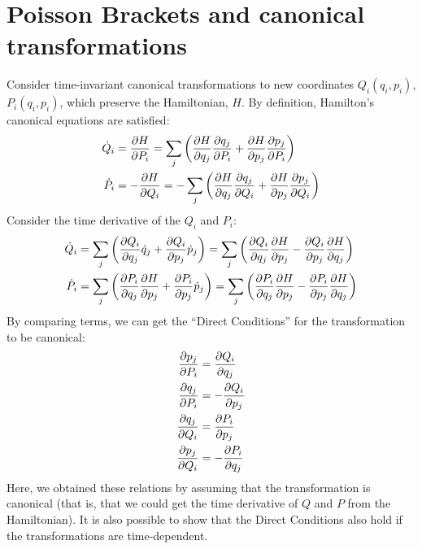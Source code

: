 \section{Poisson Brackets and canonical transformations}
Consider time-invariant canonical transformations to new coordinates $Q_i(q_i,p_i)$, $P_i(q_i,p_i)$, which preserve the Hamiltonian, $H$. By definition, Hamilton's canonical equations are satisfied:
\begin{align}
\dot Q_i&=\frac{\partial H}{\partial P_i}=\sum_j\left( \frac{\partial H}{\partial q_j}\frac{\partial q_j}{\partial P_i}+\frac{\partial H}{\partial p_j}\frac{\partial p_j}{\partial P_i} \right)\nonumber\\
\dot P_i&=-\frac{\partial H}{\partial Q_i}=-\sum_j\left( \frac{\partial H}{\partial q_j}\frac{\partial q_j}{\partial Q_i}+\frac{\partial H}{\partial p_j}\frac{\partial p_j}{\partial Q_i} \right)\nonumber\\
\end{align}
Consider the time derivative of the $Q_i$ and $P_i$:
\begin{align}
\dot Q_i&=\sum_j\left(\frac{\partial Q_i}{\partial q_j}\dot q_j+\frac{\partial Q_i}{\partial p_j}\dot p_j\right)=\sum_j\left(\frac{\partial Q_i}{\partial q_j}\frac{\partial H}{\partial p_j}-\frac{\partial Q_i}{\partial p_j}\frac{\partial H}{\partial q_j}\right)\nonumber\\
\dot P_i&=\sum_j \left(\frac{\partial P_i}{\partial q_j}\frac{\partial H}{\partial p_j}+\frac{\partial P_i}{\partial p_j}\dot p_j\right)=\sum_j \left(\frac{\partial P_i}{\partial q_j}\frac{\partial H}{\partial p_j}-\frac{\partial P_i}{\partial p_j}\frac{\partial H}{\partial q_j}\right)
\end{align}
By comparing terms, we can get the ``Direct Conditions'' for the transformation to be canonical:
\begin{align}
\frac{\partial p_j}{\partial P_i}&=\frac{\partial Q_i}{\partial q_j}\nonumber\\
\frac{\partial q_j}{\partial P_i}&=-\frac{\partial Q_i}{\partial p_j}\nonumber\\
\frac{\partial q_j}{\partial Q_i}&=\frac{\partial P_i}{\partial p_j}\nonumber\\
\frac{\partial p_j}{\partial Q_i}&=-\frac{\partial P_i}{\partial q_j}\nonumber\\
\end{align}
Here, we obtained these relations by assuming that the transformation is canonical (that is, that we could get the time derivative of $Q$ and $P$ from the Hamiltonian). It is also possible to show that the Direct Conditions also hold if the transformations are time-dependent.

